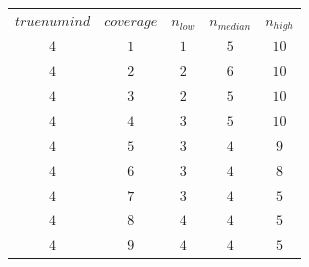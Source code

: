 \begin{table}[H]
\begin{tabular}{ccccc}
$truenumind$ & $coverage$ & $n_{low}$ & $n_{median}$ & $n_{high}$\\
$4$ & $1$ & $1$ & $5$ & $10$\\
$4$ & $2$ & $2$ & $6$ & $10$\\
$4$ & $3$ & $2$ & $5$ & $10$\\
$4$ & $4$ & $3$ & $5$ & $10$\\
$4$ & $5$ & $3$ & $4$ & $9$\\
$4$ & $6$ & $3$ & $4$ & $8$\\
$4$ & $7$ & $3$ & $4$ & $5$\\
$4$ & $8$ & $4$ & $4$ & $5$\\
$4$ & $9$ & $4$ & $4$ & $5$\\
\end{tabular}
\end{table}
 